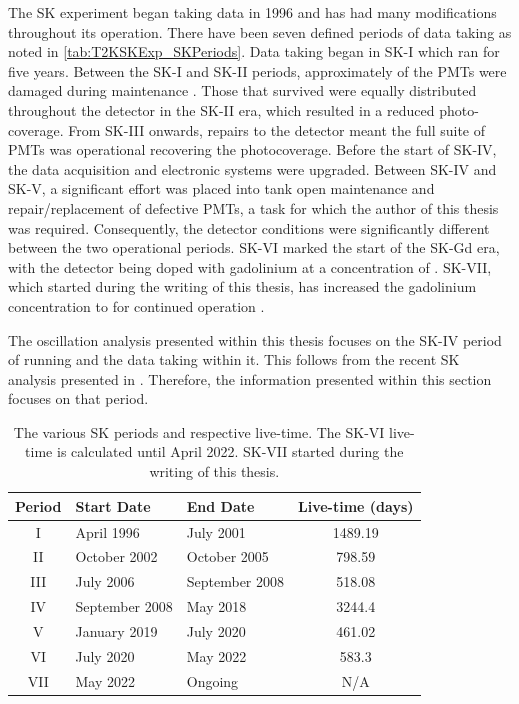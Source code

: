 The SK experiment began taking data in 1996 \cite{Fukuda1998-tw} and has had many modifications throughout its operation. There have been seven defined periods of data taking as noted in \autoref{tab:T2KSKExp_SKPeriods}. Data taking began in SK-I which ran for five years. Between the SK-I and SK-II periods, approximately  of the PMTs were damaged during maintenance \cite{Abe_2014_SKCalib}. Those that survived were equally distributed throughout the detector in the SK-II era, which resulted in a reduced  photo-coverage. From SK-III onwards, repairs to the detector meant the full suite of PMTs was operational recovering the  photocoverage. Before the start of SK-IV, the data acquisition and electronic systems were upgraded. Between SK-IV and SK-V, a significant effort was placed into tank open maintenance and repair/replacement of defective PMTs, a task for which the author of this thesis was required. Consequently, the detector conditions were significantly different between the two operational periods. SK-VI marked the start of the SK-Gd era, with the detector being doped with gadolinium at a concentration of . SK-VII, which started during the writing of this thesis, has increased the gadolinium concentration to  for continued operation \cite{10.5281/zenodo.6694761}.

The oscillation analysis presented within this thesis focuses on the SK-IV period of running and the data taking within it. This follows from the recent SK analysis presented in \cite{thesis_miao}. Therefore, the information presented within this section focuses on that period.

\begin{table}[ht!]
    \centering
    \begin{tabular}{c|l|l|c}
      \hline
      Period & Start Date & End Date & Live-time (days) \\
      \hline
      I & April 1996 & July 2001 & 1489.19 \\
      II & October 2002 & October 2005 & 798.59 \\
      III & July 2006 & September 2008 & 518.08 \\
      IV & September 2008 & May 2018 & 3244.4 \\
      V & January 2019 & July 2020 & 461.02 \\
      VI & July 2020 & May 2022 & 583.3 \\
      VII & May 2022 & Ongoing & N/A \\
      \hline 
      \hline
    \end{tabular}
    \caption{The various SK periods and respective live-time. The SK-VI live-time is calculated until  April 2022. SK-VII started during the writing of this thesis.}
    \label{tab:T2KSKExp_SKPeriods}
\end{table}

